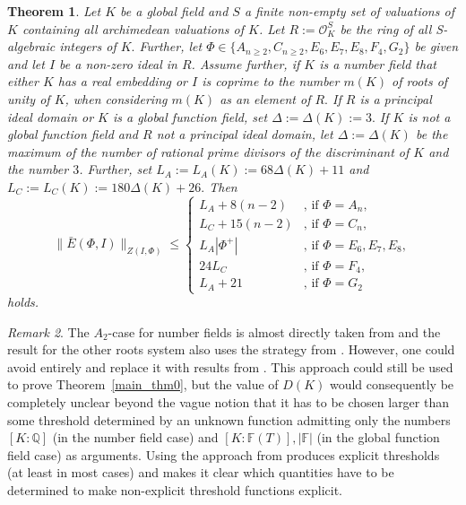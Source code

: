 \documentclass[12pt]{amsart}
\newtheorem{theorem}{Theorem}[section]
\theoremstyle{definition}\newtheorem{definition}[theorem]{Definition}
\theoremstyle{remark}\newtheorem{remark}[theorem]{Remark}
\theoremstyle{definition}\newtheorem{case}{Case}
\begin{document}
\begin{theorem}\label{main_thm2_technical}
Let $K$ be a global field and $S$ a finite non-empty set of valuations of $K$ containing all archimedean valuations of $K$. Let $R:=\mathscr{O}_K^S$ be the ring of all S-algebraic integers of $K.$ Further, let $\Phi\in\{A_{n\geq 2},C_{n\geq 2},E_6,E_7,E_8,F_4,G_2\}$ be given and let $I$ be a non-zero ideal in $R$. Assume further, if $K$ is a number field that either $K$ has a real embedding or $I$ is coprime to the number $m(K)$ of roots of unity of $K$, when considering $m(K)$ as an element of $R.$ If $R$ is a principal ideal domain or $K$ is a global function field, set $\Delta:=\Delta(K):=3.$ If $K$ is not a global function field and $R$ not a principal ideal domain, let $\Delta:=\Delta(K)$ be the maximum of the number of rational prime divisors of the discriminant of $K$ and the number $3$. Further, set $L_A:=L_A(K):=68\Delta(K)+11$ and $L_C:=L_C(K):=180\Delta(K)+26.$
Then
\begin{equation*}
\|\bar{E}(\Phi,I)\|_{Z(I,\Phi)}\leq
\begin{cases}
L_A+8(n-2)&\text{, if }\Phi=A_n,\\
L_C+15(n-2)&\text{, if }\Phi=C_n,\\
L_A|\Phi^+|&\text{, if }\Phi=E_6,E_7,E_8,\\
24L_C&\text{, if }\Phi=F_4,\\
L_A+21&\text{, if }\Phi=G_2
\end{cases}
\end{equation*}
holds.
\end{theorem}

\begin{remark}
The $A_2$-case for number fields is almost directly taken from \cite[Corollary~3.3]{gvozdevsky2023width} and the result for the other roots system also uses the strategy from \cite{gvozdevsky2023width}. However, one could avoid \cite{gvozdevsky2023width} entirely and replace it with results from \cite{MR2357719,Chevalley_positive_char_tentative}. This approach could still be used to prove Theorem~\ref{main_thm0}, but the value of $D(K)$ would consequently be completely unclear beyond the vague notion that it has to be chosen larger than some threshold determined by an unknown function admitting only the numbers $[K:\mathbb{Q}]$ (in the number field case) and $[K:\mathbb{F}(T)],|\mathbb{F}|$ (in the global function field case) as arguments. Using the approach from \cite{gvozdevsky2023width} produces explicit thresholds (at least in most cases) and makes it clear which quantities have to be determined to make non-explicit threshold functions explicit. 
\end{remark}
\end{document}
